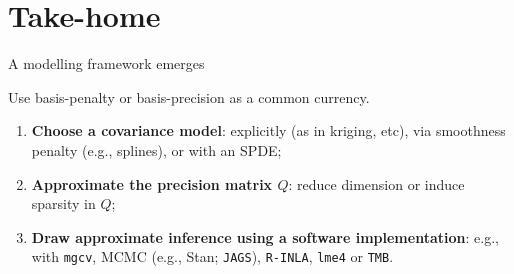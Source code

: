 \documentclass{beamer}
\begin{document}
%
%
%
%
%
%



\section{Take-home}

\begin{frame}{A modelling framework emerges}

Use basis-penalty or basis-precision as a common currency.

\begin{enumerate}
 \item \textbf{Choose a covariance model}: explicitly (as in kriging, etc), via smoothness penalty (e.g., splines), or with an SPDE;
 \item \textbf{Approximate the precision matrix \(Q\)}: reduce dimension or induce sparsity in \(Q\);
 \item \textbf{Draw approximate inference using a software implementation}: e.g., with \texttt{mgcv}, MCMC (e.g., Stan; \texttt{JAGS}), \texttt{R-INLA}, \texttt{lme4}  or \texttt{TMB}.
\end{enumerate}

\end{frame}
\end{document}
